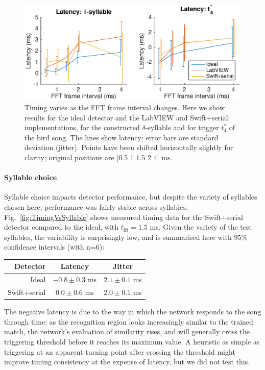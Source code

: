 \documentclass[10pt,letterpaper]{article}
\newcommand\fig[1]{Fig.~\ref{#1}}
\renewcommand{\subsubsection}[1]{\paragraph{#1}}
\begin{document}
\begin{figure}
  \includegraphics[width=\textwidth]{Fig4}
  \caption{Timing varies as the FFT frame interval changes.  Here we
    show results for the ideal detector and the LabVIEW and
    Swift+serial implementations, for the constructed
    $\delta$-syllable and for trigger $t^*_4$ of the bird song.  The
    lines show latency; error bars are standard deviation (jitter).  Points have
    been shifted horizontally slightly for clarity; original positions are [0.5 1
      1.5 2 4] ms.}
  \label{fig:TimingVsFrame}
\end{figure}

\subsubsection{Syllable choice}

Syllable choice impacts detector performance, but despite the variety
of syllables chosen here, performance was fairly stable across
syllables.  \fig{fig:TimingVsSyllable} shows measured timing data for
the Swift+serial detector compared to the ideal, with
$t_{\textrm{fft}}=1.5$ ms.  Given the variety of the test syllables,
the variability is surprisingly low, and is summarised here with 95\%
confidence intervals (with n=6):
\vspace{8pt}\par\noindent
\begin{tabular}{r|cc}
  Detector & Latency & Jitter \\ 
  \hline   Ideal & $-0.8\pm 0.3$ ms & $2.1\pm 0.1$ ms \\
  Swift+serial & $0.0\pm 0.6$ ms & $2.0\pm 0.1$ ms
\end{tabular}
\vspace{8pt}\par\noindent
The negative latency is due to the way in which the network responds
to the song through time: as the recognition region looks increasingly
similar to the trained match, the network's evaluation of similarity
rises, and will generally cross the triggering threshold before it
reaches its maximum value.  A heuristic as simple as triggering at an
apparent turning point after crossing the threshold might improve
timing consistency at the expense of latency, but we did not test this.
\end{document}
